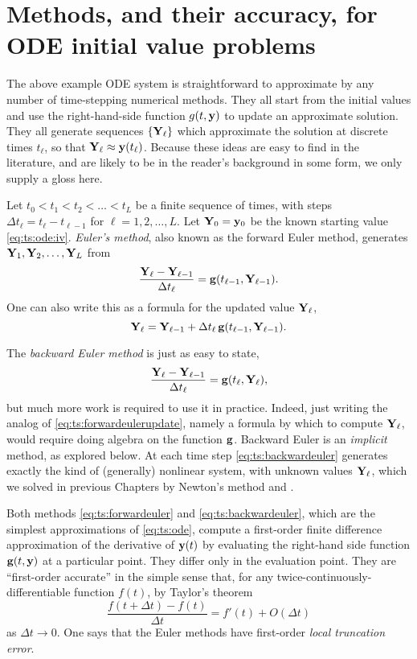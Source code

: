 \section{Methods, and their accuracy, for ODE initial value problems}  The above example ODE system is straightforward to approximate by any number of time-stepping numerical methods.  They all start from the initial values and use the right-hand-side function $g(t,\mathbf{y})$ to update an approximate solution.  They all generate sequences $\{\mathbf{Y}_\ell\}$ which approximate the solution at discrete times $t_\ell$, so that $\mathbf{Y}_\ell \approx \mathbf{y}(t_\ell)$.  Because these ideas are easy to find in the literature, and are likely to be in the reader's background in some form, we only supply a gloss here.

Let $t_0<t_1<t_2<\dots<t_L$ be a finite sequence of times, with steps $\Delta t_\ell = t_\ell - t_{\ell-1}$ for $\ell=1,2,\dots,L$.  Let $\mathbf{Y}_0 = \mathbf{y}_0$ be the known starting value  \eqref{eq:ts:ode:iv}.  \emph{Euler's method}, also known as the forward Euler method, generates $\mathbf{Y}_1,\mathbf{Y}_2,\dots,\mathbf{Y}_L$ from
\begin{equation}
\frac{\mathbf{Y}_\ell - \mathbf{Y}_{\ell-1}}{\Delta t_\ell} = \mathbf{g}(t_{\ell-1},\mathbf{Y}_{\ell-1}). \label{eq:ts:forwardeuler}
\end{equation}
One can also write this as a formula for the updated value $\mathbf{Y}_\ell$,
\begin{equation}
\mathbf{Y}_\ell = \mathbf{Y}_{\ell-1} + \Delta t_\ell \, \mathbf{g}(t_{\ell-1},\mathbf{Y}_{\ell-1}). \label{eq:ts:forwardeulerupdate}
\end{equation}

The \emph{backward Euler method} is just as easy to state,
\begin{equation}
\frac{\mathbf{Y}_\ell - \mathbf{Y}_{\ell-1}}{\Delta t_\ell} = \mathbf{g}(t_{\ell},\mathbf{Y}_{\ell}),  \label{eq:ts:backwardeuler}
\end{equation}
but much more work is required to use it in practice.  Indeed, just writing the analog of \eqref{eq:ts:forwardeulerupdate}, namely a formula by which to compute $\mathbf{Y}_\ell$, would require doing algebra on the function $\mathbf{g}$.  Backward Euler is an \emph{implicit} method, as explored below.  At each time step \eqref{eq:ts:backwardeuler} generates exactly the kind of (generally) nonlinear system, with unknown values $\mathbf{Y}_\ell$, which we solved in previous Chapters by Newton's method and \pSNES.

Both methods \eqref{eq:ts:forwardeuler} and \eqref{eq:ts:backwardeuler}, which are the simplest approximations of \eqref{eq:ts:ode}, compute a first-order finite difference approximation of the derivative of $\mathbf{y}(t)$ by evaluating the right-hand side function $\mathbf{g}(t,\mathbf{y})$ at a particular point.  They differ only in the evaluation point.  They are ``first-order accurate'' in the simple sense that, for any twice-continuously-differentiable function $f(t)$, by Taylor's theorem
    $$\frac{f(t+\Delta t) - f(t)}{\Delta t} = f'(t) + O(\Delta t)$$
as $\Delta t \to 0$.  One says that the Euler methods have first-order \emph{local truncation error}.

